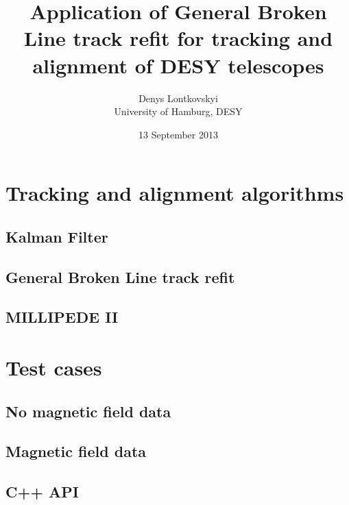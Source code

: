 \documentclass[a4paper,10pt]{article}
\title{Application of General Broken Line track refit for tracking and alignment of DESY telescopes}
\author{Denys Lontkovskyi\\University of Hamburg, DESY}
\date{13 September 2013}
\begin{document}
\maketitle



\tableofcontents



\section{Tracking and alignment algorithms}



\subsection{Kalman Filter}
\subsection{General Broken Line track refit}
\subsection{MILLIPEDE II}

\section{Test cases}
\subsection{No magnetic field data}
\subsection{Magnetic field data}

\begin{appendices}
\section{C++ API} \label{app:cppapi}
\end{appendices}



\end{document}
